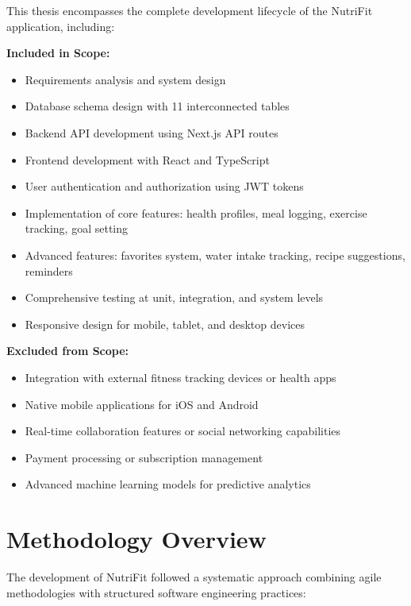 This thesis encompasses the complete development lifecycle of the NutriFit application, including:

\textbf{Included in Scope:}
\begin{itemize}
    \item Requirements analysis and system design
    \item Database schema design with 11 interconnected tables
    \item Backend API development using Next.js API routes
    \item Frontend development with React and TypeScript
    \item User authentication and authorization using JWT tokens
    \item Implementation of core features: health profiles, meal logging, exercise tracking, goal setting
    \item Advanced features: favorites system, water intake tracking, recipe suggestions, reminders
    \item Comprehensive testing at unit, integration, and system levels
    \item Responsive design for mobile, tablet, and desktop devices
\end{itemize}

\textbf{Excluded from Scope:}
\begin{itemize}
    \item Integration with external fitness tracking devices or health apps
    \item Native mobile applications for iOS and Android
    \item Real-time collaboration features or social networking capabilities
    \item Payment processing or subscription management
    \item Advanced machine learning models for predictive analytics
\end{itemize}

\section{Methodology Overview}

The development of NutriFit followed a systematic approach combining agile methodologies with structured software engineering practices:

